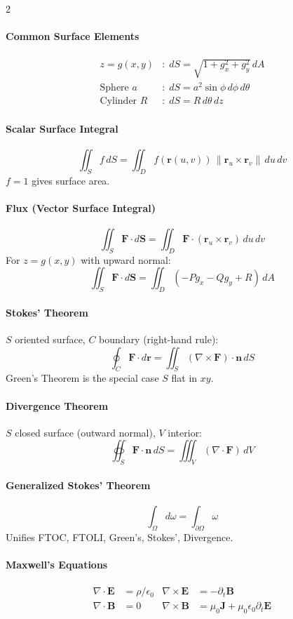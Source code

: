\begin{multicols}{2}
\paragraph{Common Surface Elements}
\begin{align*}
z = g(x,y)&: \; dS = \sqrt{1+g_x^2+g_y^2}\,dA\\
\text{Sphere } a&: \; dS = a^2\sin\phi\,d\phi\,d\theta\\
\text{Cylinder } R&: \; dS = R\,d\theta\,dz
\end{align*}

\paragraph{Scalar Surface Integral}
\[
\iint_S f\,dS = \iint_D f(\mathbf{r}(u,v))\,\|\mathbf{r}_u\times\mathbf{r}_v\|\,du\,dv
\]
$f=1$ gives surface area.

\paragraph{Flux (Vector Surface Integral)}
\[
\iint_S \mathbf{F}\cdot d\mathbf{S} = \iint_D \mathbf{F}\cdot(\mathbf{r}_u\times\mathbf{r}_v)\,du\,dv
\]
For $z = g(x,y)$ with upward normal:
\[
\iint_S \mathbf{F}\cdot d\mathbf{S} = \iint_D(-Pg_x - Qg_y + R)\,dA
\]

\paragraph{Stokes' Theorem}
$S$ oriented surface, $C$ boundary (right-hand rule):
\[
\oint_C \mathbf{F}\cdot d\mathbf{r} = \iint_S(\nabla\times\mathbf{F})\cdot\mathbf{n}\,dS
\]
Green's Theorem is the special case $S$ flat in $xy$.

\paragraph{Divergence Theorem}
$S$ closed surface (outward normal), $V$ interior:
\[
\oiint_S \mathbf{F}\cdot\mathbf{n}\,dS = \iiint_V(\nabla\cdot\mathbf{F})\,dV
\]

\paragraph{Generalized Stokes' Theorem}
\[
\int_\Omega d\omega = \int_{\partial\Omega}\omega
\]
Unifies FTOC, FTOLI, Green's, Stokes', Divergence.

\paragraph{Maxwell's Equations}
\begin{align*}
\nabla\cdot\mathbf{E} &= \rho/\epsilon_0 & \nabla\times\mathbf{E} &= -\partial_t\mathbf{B}\\
\nabla\cdot\mathbf{B} &= 0 & \nabla\times\mathbf{B} &= \mu_0\mathbf{J}+\mu_0\epsilon_0\partial_t\mathbf{E}
\end{align*}

\end{multicols}

